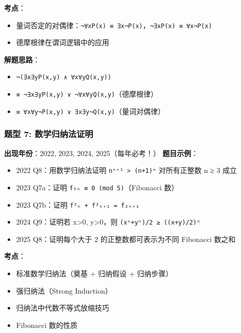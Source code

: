 \documentclass[10pt,a4paper,openany]{ctexbook}
\theoremstyle{definition}
\theoremstyle{remark}
\begin{document}
\textbf{考点}：
\begin{itemize}
\item 量词否定的对偶律：\texttt{¬∀xP(x) ≡ ∃x¬P(x)}，\texttt{¬∃xP(x) ≡ ∀x¬P(x)}
\item 德摩根律在谓词逻辑中的应用

\end{itemize}

\textbf{解题思路}：
\begin{itemize}
\item \texttt{¬(∃x∃yP(x,y) ∧ ∀x∀yQ(x,y))}
\item \texttt{≡ ¬∃x∃yP(x,y) ∨ ¬∀x∀yQ(x,y)}（德摩根律）
\item \texttt{≡ ∀x∀y¬P(x,y) ∨ ∃x∃y¬Q(x,y)}（量词对偶律）

\end{itemize}

\vspace{-2pt}

\subsubsection{题型 7: 数学归纳法证明}

\textbf{出现年份}：2022, 2023, 2024, 2025（每年必考！）
\textbf{题目示例}：
\begin{itemize}
\item 2022 Q8：用数学归纳法证明 \texttt{nⁿ⁺¹ > (n+1)ⁿ} 对所有正整数 n ≥ 3 成立
\item 2023 Q7a：证明 \texttt{f₅ₙ ≡ 0 (mod 5)}（Fibonacci 数）
\item 2023 Q7b：证明 \texttt{f²ₙ + f²ₙ₊₁ = f₂ₙ₊₁}
\item 2024 Q9：证明若 x>0, y>0，则 \texttt{(xⁿ+yⁿ)/2 ≥ ((x+y)/2)ⁿ}
\item 2025 Q8：证明每个大于 2 的正整数都可表示为不同 Fibonacci 数之和

\end{itemize}

\textbf{考点}：
\begin{itemize}
\item 标准数学归纳法（奠基 + 归纳假设 + 归纳步骤）
\item 强归纳法（Strong Induction）
\item 归纳法中代数不等式放缩技巧
\item Fibonacci 数的性质

\end{itemize}
\end{document}
